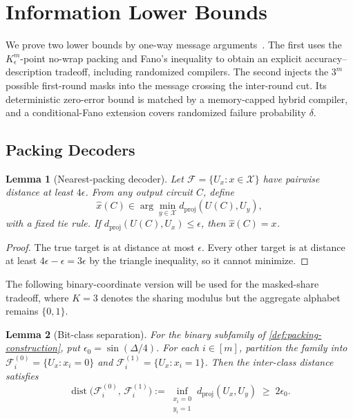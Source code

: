 \documentclass[aps,prx,reprint,floatfix,superscriptaddress]{revtex4-2}
\newtheorem{lemma}{Lemma}
\begin{document}
\section{Information Lower Bounds}
\label{sec:reduction}

We prove two lower bounds by one-way message arguments~\cite{kushilevitz1997communication}.
The first uses the $K_\epsilon^m$-point no-wrap packing and Fano's inequality
to obtain an explicit accuracy--description tradeoff, including randomized
compilers.  The second injects the $3^m$ possible first-round masks into the
message crossing the inter-round cut.  Its deterministic zero-error bound is
matched by a memory-capped hybrid compiler, and a conditional-Fano extension
covers randomized failure probability $\delta$.

\subsection{Packing Decoders}

\begin{lemma}[Nearest-packing decoder]
\label{lem:nearest-decoder}
Let $\mathcal F=\{U_x:x\in\mathcal X\}$ have pairwise distance at least
$4\epsilon$.  From any output circuit $C$, define
\begin{equation*}
 \widehat x(C)\in\arg\min_{y\in\mathcal X}
       d_{\mathrm{proj}}(U(C),U_y),
\end{equation*}
with a fixed tie rule.  If
$d_{\mathrm{proj}}(U(C),U_x)\leq\epsilon$, then $\widehat x(C)=x$.
\end{lemma}

\begin{proof}
The true target is at distance at most $\epsilon$.  Every other target is
at distance at least $4\epsilon-\epsilon=3\epsilon$ by the triangle
inequality, so it cannot minimize.
\end{proof}

The following binary-coordinate version will be used for the masked-share
tradeoff, where $K=3$ denotes the sharing modulus but the aggregate alphabet
remains $\{0,1\}$.

\begin{lemma}[Bit-class separation]
\label{lem:bit-class-separation}
For the binary subfamily of \cref{def:packing-construction}, put
$\epsilon_0=\sin(\Delta/4)$.  For each $i \in [m]$, partition the family into
$\mathcal{F}_i^{(0)} = \{U_x : x_i = 0\}$ and
$\mathcal{F}_i^{(1)} = \{U_x : x_i = 1\}$. Then the inter-class distance
satisfies
\begin{equation}\label{eq:bit-class-sep}
\operatorname{dist}\!\bigl(\mathcal{F}_i^{(0)},\,\mathcal{F}_i^{(1)}\bigr)
:= \inf_{\substack{x_i=0 \\ y_i=1}} d_{\mathrm{proj}}(U_x, U_y)
\;\geq\; 2\epsilon_0.
\end{equation}
\end{lemma}
\end{document}
